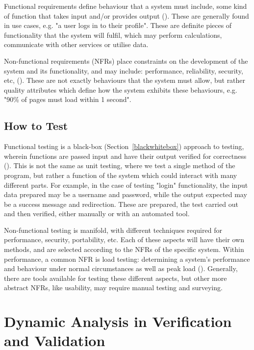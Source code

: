 \documentclass[12pt]{article}
\begin{document}
Functional requirements define behaviour that a system must include, some kind of function that takes input and/or provides output (). These are generally found in use cases, e.g. "a user logs in to their profile". These are definite pieces of functionality that the system will fulfil, which may perform calculations, communicate with other services or utilise data.

Non-functional requirements (NFRs) place constraints on the development of the system and its functionality, and may include: performance, reliability, security, etc, (). These are not exactly behaviours that the system must allow, but rather quality attributes which define how the system exhibits these behaviours, e.g. "90\% of pages must load within 1 second".



\subsection{How to Test}

Functional testing is a black-box (Section~\ref{blackwhitebox}) approach to testing, wherein functions are passed input and have their output verified for correctness (). This is not the same as unit testing, where we test a single method of the program, but rather a function of the system which could interact with many different parts. For example, in the case of testing "login" functionality, the input data prepared may be a username and password, while the output expected may be a success message and redirection. These are prepared, the test carried out and then verified, either manually or with an automated tool.

Non-functional testing is manifold, with different techniques required for performance, security, portability, etc. Each of these aspects will have their own methods, and are selected according to the NFRs of the specific system. Within performance, a common NFR is load testing: determining a system's performance and behaviour under normal circumstances as well as peak load (). Generally, there are tools available for testing these different aspects, but other more abstract NFRs, like usability, may require manual testing and surveying.



\section{Dynamic Analysis in Verification and Validation} \label{veri_vali}
\end{document}
